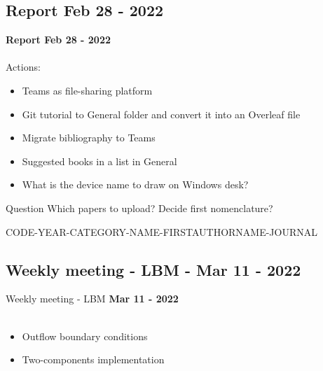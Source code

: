 \documentclass[8pt]{beamer}
\begin{document}

	\subsection*{Report Feb 28 - 2022}
	\label{}
	\justifying
	\begin{frame}
		\textbf{Report Feb 28 - 2022}\\~\\
		Actions:
		\begin{itemize}
			\item Teams as file-sharing platform
			\item Git tutorial to General folder and convert it into an Overleaf file
			\item Migrate bibliography to Teams
			\item Suggested books in a list in General
			\item What is the device name to draw on Windows desk?
		\end{itemize}
	
	\begin{block}{Question}
		Which papers to upload? Decide first nomenclature?
	\end{block}

	CODE-YEAR-CATEGORY-NAME-FIRSTAUTHORNAME-JOURNAL
	\end{frame}


	
	\subsection{Weekly meeting - LBM - Mar 11 - 2022}
	\label{}
	\justifying
	\begin{frame}{Weekly meeting - LBM}
		\textbf{Mar 11 - 2022}\\~\\
		\begin{itemize}
			
			\item Outflow boundary conditions
			\item Two-components implementation

		\end{itemize}
	\end{frame}
	
\end{document}
